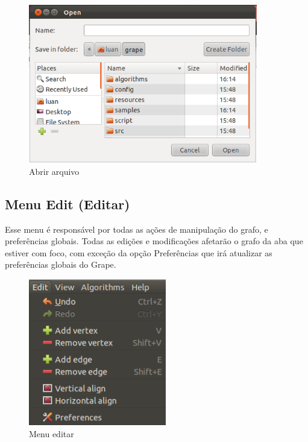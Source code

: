 \documentclass[a4paper]{abnt}
\begin{document}
\begin{figure}[htb]
    \centering
	\includegraphics[width=10cm]{open_dialog.png}
	\caption{Abrir arquivo}
	\label{img_open_dialog}
\end{figure}

\subsection{Menu Edit (Editar)}

Esse menu é responsável por todas as ações de manipulação do grafo, e preferências globais. Todas as edições e modificações afetarão o grafo da aba que estiver com foco, com exceção da opção Preferências que irá atualizar as preferências globais do Grape.
\begin{figure}[htb]
    \centering
	\includegraphics[width=6cm]{grape_menu_edit.png}
	\caption{Menu editar}
	\label{img_menu_edit}
\end{figure}
\end{document}
